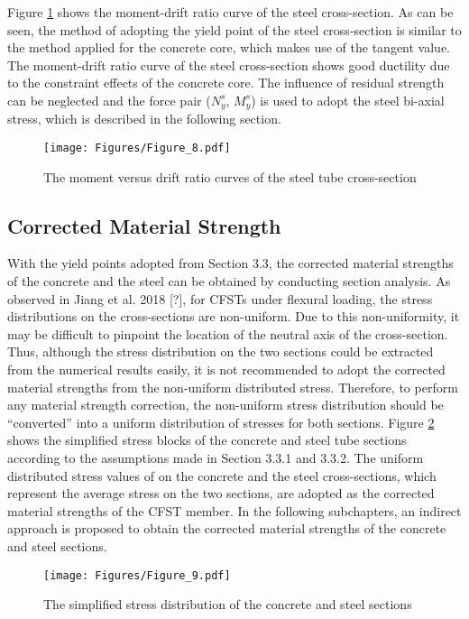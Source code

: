 \documentclass[12pt,a4]{article}
\begin{document}
	\par
	Figure \ref{fig-7} shows the moment-drift ratio curve of the steel cross-section. As can be seen, the method of adopting the yield point of the steel cross-section is similar to the method applied for the concrete core, which makes use of the tangent value. The moment-drift ratio curve of the steel cross-section shows good ductility due to the constraint effects of the concrete core. The influence of residual strength can be neglected and the force pair ($N_y^s$, $M_y^s$) is used to adopt the steel bi-axial stress, which is described in the following section.
	\par
	\begin{figure}[h]
		\centering
		\texttt{[image: Figures/Figure\_8.pdf]}
		\caption{The moment versus drift ratio curves of the steel tube cross-section}
		\label{fig-7}
	\end{figure}
	\par
	\subsection{Corrected Material Strength}
	With the yield points adopted from Section 3.3, the corrected material strengths of the concrete and the steel can be obtained by conducting section analysis. As observed in Jiang et al. 2018 [?], for CFSTs under flexural loading, the stress distributions on the cross-sections are non-uniform. Due to this non-uniformity, it may be difficult to pinpoint the location of the neutral axis of the cross-section. Thus, although the stress distribution on the two sections could be extracted from the numerical results easily, it is not recommended to adopt the corrected material strengths from the non-uniform distributed stress. Therefore, to perform any material strength correction, the non-uniform stress distribution should be “converted” into a uniform distribution of stresses for both sections. Figure \ref{fig-8} shows the simplified stress blocks of the concrete and steel tube sections according to the assumptions made in Section 3.3.1 and 3.3.2. The uniform distributed stress values of on the concrete and the steel cross-sections, which represent the average stress on the two sections, are adopted as the corrected material strengths of the CFST member. In the following subchapters, an indirect approach is proposed to obtain the corrected material strengths of the concrete and steel sections.
	\par
	\begin{figure}[h]
		\centering
		\texttt{[image: Figures/Figure\_9.pdf]}
		\caption{The simplified stress distribution of the concrete and steel sections}
		\label{fig-8}
	\end{figure}
	\par
\end{document}
